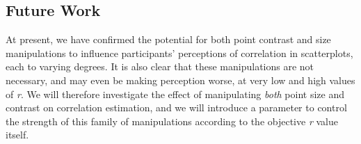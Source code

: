 \documentclass{vgtc}                          %
\begin{document}
\hypertarget{future-work}{%
\subsection{Future Work}\label{future-work}}

At present, we have confirmed the potential for both point contrast and size
manipulations to influence participants' perceptions of correlation in scatterplots,
each to varying degrees. It is also clear that these manipulations are not necessary,
and may even be making perception worse, at very low and high values of \emph{r}. We will therefore
investigate the effect of manipulating \emph{both} point size and contrast on correlation estimation, and we will introduce a
parameter to control the strength of this family of manipulations according to the
objective \emph{r} value itself.


%

%
%
%


\end{document}
